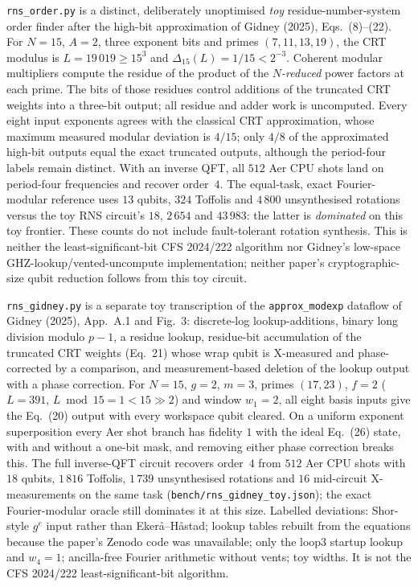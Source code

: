\documentclass[11pt]{article}
\newcommand{\code}[1]{\texttt{#1}}
\theoremstyle{plain}
\theoremstyle{remark}
\begin{document}
\begin{warnbox}[title={What is built, and what is not}]
\code{rns\_order.py} is a distinct, deliberately unoptimised \emph{toy}
residue-number-system order finder after the high-bit approximation of
Gidney (2025), Eqs.~(8)--(22). For $N=15$, $A=2$, three exponent bits and
primes $(7,11,13,19)$, the CRT modulus is $L=19\,019\geq15^3$ and
$\Delta_{15}(L)=1/15<2^{-3}$. Coherent modular multipliers compute the
residue of the product of the \emph{$N$-reduced} power factors at each
prime. The bits of those residues control additions of the truncated
CRT weights into a three-bit output; all residue and adder work is
uncomputed. Every eight input exponents agrees with the classical CRT
approximation, whose maximum measured modular deviation is $4/15$;
only $4/8$ of the approximated high-bit outputs equal the exact truncated
outputs, although the period-four labels remain distinct.
With an inverse QFT, all $512$ Aer CPU shots land on period-four
frequencies and recover order~$4$. The equal-task, exact Fourier-modular
reference uses $13$ qubits, $324$ Toffolis and $4\,800$ unsynthesised
rotations versus the toy RNS circuit's $18$, $2\,654$ and $43\,983$:
the latter is \emph{dominated} on this toy frontier. These counts do not
include fault-tolerant rotation synthesis. This is neither the
least-significant-bit CFS 2024/222 algorithm nor Gidney's low-space
GHZ-lookup/vented-uncompute implementation; neither paper's
cryptographic-size qubit reduction follows from this toy circuit.

\code{rns\_gidney.py} is a separate toy transcription of the
\code{approx\_modexp} dataflow of Gidney (2025), App.~A.1 and Fig.~3:
discrete-log lookup-additions, binary long division modulo $p-1$, a
residue lookup, residue-bit accumulation of the truncated CRT weights
(Eq.~21) whose wrap qubit is X-measured and phase-corrected by a
comparison, and measurement-based deletion of the lookup output with a
phase correction. For $N=15$, $g=2$, $m=3$, primes $(17,23)$, $f=2$
($L=391$, $L\bmod15=1<15\gg2$) and window $w_1=2$, all eight basis
inputs give the Eq.~(20) output with every workspace qubit cleared. On a
uniform exponent superposition every Aer shot branch has fidelity $1$
with the ideal Eq.~(26) state, with and without a one-bit mask, and
removing either phase correction breaks this. The full inverse-QFT
circuit recovers order~$4$ from $512$ Aer CPU shots with $18$ qubits,
$1\,816$ Toffolis, $1\,739$ unsynthesised rotations and $16$ mid-circuit
X-measurements on the same task (\code{bench/rns\_gidney\_toy.json});
the exact Fourier-modular oracle still dominates it at this size.
Labelled deviations: Shor-style $g^e$ input rather than
Eker\aa--H\aa stad; lookup tables rebuilt from the equations because the
paper's Zenodo code was unavailable; only the loop3 startup lookup and
$w_4=1$; ancilla-free Fourier arithmetic without vents; toy widths. It
is not the CFS 2024/222 least-significant-bit algorithm.


\end{warnbox}
\end{document}
